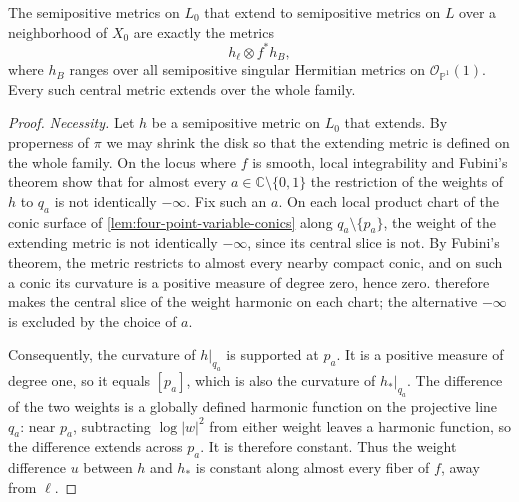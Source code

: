 \begin{theorem}\label{thm:four-point-metric-restriction-image}
The semipositive metrics on $L_0$ that extend to semipositive metrics on $L$ over a neighborhood of $X_0$ are exactly the metrics
\[
 h_\ell\otimes f^*h_B,
\]
where $h_B$ ranges over all semipositive singular Hermitian metrics on $\mathcal O_{\mathbb P^1}(1)$. Every such central metric extends over the whole family.
\end{theorem}
\begin{proof}
\emph{Necessity.} Let $h$ be a semipositive metric on $L_0$ that extends. By properness of $\pi$ we may shrink the disk so that the extending metric is defined on the whole family. On the locus where $f$ is smooth, local integrability and Fubini's theorem show that for almost every $a\in\mathbb C\setminus\{0,1\}$ the restriction of the weights of $h$ to $q_a$ is not identically $-\infty$. Fix such an $a$. On each local product chart of the conic surface of \cref{lem:four-point-variable-conics} along $q_a\setminus\{p_a\}$, the weight of the extending metric is not identically $-\infty$, since its central slice is not. By Fubini's theorem, the metric restricts to almost every nearby compact conic, and on such a conic its curvature is a positive measure of degree zero, hence zero.  therefore makes the central slice of the weight harmonic on each chart; the alternative $-\infty$ is excluded by the choice of $a$.

Consequently, the curvature of $h|_{q_a}$ is supported at $p_a$. It is a positive measure of degree one, so it equals $[p_a]$, which is also the curvature of $h_*|_{q_a}$. The difference of the two weights is a globally defined harmonic function on the projective line $q_a$: near $p_a$, subtracting $\log|w|^2$ from either weight leaves a harmonic function, so the difference extends across $p_a$. It is therefore constant. Thus the weight difference $u$ between $h$ and $h_*$ is constant along almost every fiber of $f$, away from $\ell$.


\end{proof}
